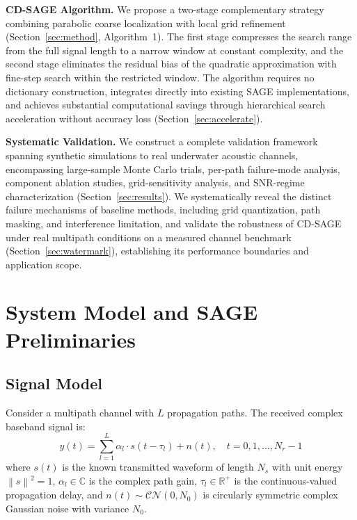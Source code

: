 \documentclass[a4paper,fleqn]{cas-dc}
\newcommand{\Cc}{\mathbb{C}}
\newcommand{\Rr}{\mathbb{R}}
\newcommand{\cN}{\mathcal{CN}}
\newcommand{\norm}[1]{\left\lVert #1 \right\rVert}
\begin{document}
\noindent\textbf{CD-SAGE Algorithm.} We propose a two-stage complementary strategy combining parabolic coarse localization with local grid refinement (Section~\ref{sec:method}, Algorithm~1). The first stage compresses the search range from the full signal length to a narrow window at constant complexity, and the second stage eliminates the residual bias of the quadratic approximation with fine-step search within the restricted window. The algorithm requires no dictionary construction, integrates directly into existing SAGE implementations, and achieves substantial computational savings through hierarchical search acceleration without accuracy loss (Section~\ref{sec:accelerate}).

\noindent\textbf{Systematic Validation.} We construct a complete validation framework spanning synthetic simulations to real underwater acoustic channels, encompassing large-sample Monte Carlo trials, per-path failure-mode analysis, component ablation studies, grid-sensitivity analysis, and SNR-regime characterization (Section~\ref{sec:results}). We systematically reveal the distinct failure mechanisms of baseline methods, including grid quantization, path masking, and interference limitation, and validate the robustness of CD-SAGE under real multipath conditions on a measured channel benchmark (Section~\ref{sec:watermark}), establishing its performance boundaries and application scope.

\section{System Model and SAGE Preliminaries}
\label{sec:system}

\subsection{Signal Model}

Consider a multipath channel with $L$ propagation paths. The received complex baseband signal is:
\begin{equation}
y(t) = \sum_{l=1}^{L} \alpha_l \cdot s(t - \tau_l) + n(t), \quad t = 0, 1, \ldots, N_r-1
\label{eq:sigmodel}
\end{equation}
where $s(t)$ is the known transmitted waveform of length $N_s$ with unit energy $\norm{s}^2 = 1$, $\alpha_l \in \Cc$ is the complex path gain, $\tau_l \in \Rr^+$ is the continuous-valued propagation delay, and $n(t) \sim \cN(0, N_0)$ is circularly symmetric complex Gaussian noise with variance $N_0$.
\end{document}
